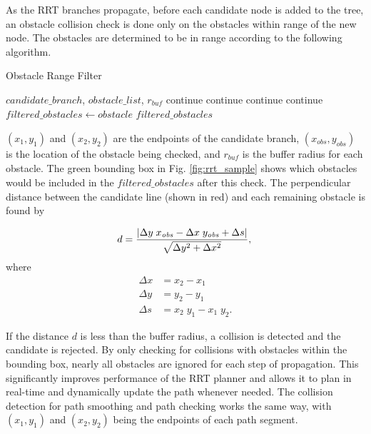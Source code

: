 \documentclass[letterpaper, 10 pt, conference]{ieeeconf}  %
\begin{document}
As the RRT branches propagate, before each candidate node is added to the tree, an obstacle collision check is done only on the obstacles within range of the new node. The obstacles are determined to be in range according to the following algorithm.

\begin{algorithm}
  \caption{Obstacle Range Filter}
  \label{dyn_path_plan}
\begin{algorithmic}
  \REQUIRE $\mathit{candidate\_branch}$, $\mathit{obstacle\_list}$, $r_{\mathit{buf}}$
      \STATE continue
      \STATE continue
      \STATE continue
      \STATE continue
    \ELSE
      \STATE $\mathit{filtered\_obstacles} \gets \mathit{obstacle}$
    \ENDIF
  \ENDFOR
  \RETURN $\mathit{filtered\_obstacles}$
\end{algorithmic}
\end{algorithm}

 $(x_1,y_1)$ and $(x_2,y_2)$ are the endpoints of the candidate branch, $(x_{\mathit{obs}},y_{\mathit{obs}})$ is the location of the obstacle being checked, and $r_{\mathit{buf}}$ is the buffer radius for each obstacle. The green bounding box in Fig. \ref{fig:rrt_sample} shows which obstacles would be included in the $\mathit{filtered\_obstacles}$ after this check. The perpendicular distance between the candidate line (shown in red) and each remaining obstacle is found by

\begin{equation}
  d = \dfrac{|\Delta y \; x_{\mathit{obs}} -
      \Delta x \; y_{\mathit{obs}} + \Delta s|}
      {\sqrt{\Delta y^2 + \Delta x^2}},\\
\end{equation}
where
\begin{align}
  \Delta x &= x_2 - x_1\\
  \Delta y &= y_2 - y_1\\
  \Delta s &= x_2 \; y_1 -x_1 \; y_2.
\end{align}

 If the distance $d$ is less than the buffer radius, a collision is detected and the candidate is rejected. By only checking for collisions with obstacles within the bounding box, nearly all obstacles are ignored for each step of propagation. This significantly improves performance of the RRT planner and allows it to plan in real-time and dynamically update the path whenever needed. The collision detection for path smoothing and path checking works the same way, with $(x_1,y_1)$ and $(x_2,y_2)$ being the endpoints of each path segment.
\end{document}
